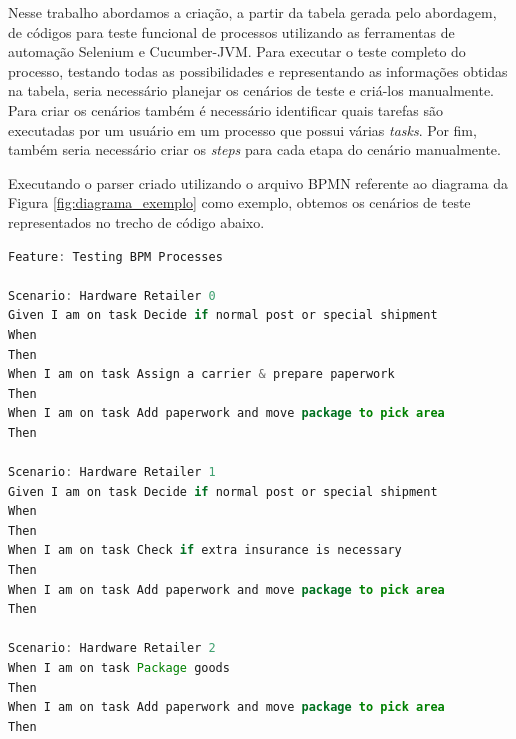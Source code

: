 \documentclass[12pt]{article}
\begin{document}
\begin{table}[]
\centering
\caption{Tabela obtida através do arquivo BPMN}
\label{tab:resultado}
\end{table}

Nesse trabalho abordamos a criação, a partir da tabela gerada pelo abordagem, de códigos para teste funcional de processos utilizando as ferramentas de automação Selenium e Cucumber-JVM. Para executar o teste completo do processo, testando todas as possibilidades e representando as informações obtidas na tabela, seria necessário planejar os cenários de teste e criá-los manualmente. Para criar os cenários também é necessário identificar quais tarefas são executadas por um usuário em um processo que possui várias \emph{tasks}. Por fim, também seria necessário criar os \emph{steps} para cada etapa do cenário manualmente.

Executando o parser criado utilizando o arquivo BPMN referente ao diagrama da Figura \ref{fig:diagrama_exemplo} como exemplo, obtemos os cenários de teste representados no trecho de código abaixo. 
\begin{lstlisting}[language=Java]
Feature: Testing BPM Processes  
 
Scenario: Hardware Retailer 0 
Given I am on task Decide if normal post or special shipment 
When 
Then 
When I am on task Assign a carrier & prepare paperwork 
Then 
When I am on task Add paperwork and move package to pick area 
Then 
 
Scenario: Hardware Retailer 1 
Given I am on task Decide if normal post or special shipment 
When 
Then 
When I am on task Check if extra insurance is necessary 
Then 
When I am on task Add paperwork and move package to pick area 
Then 
 
Scenario: Hardware Retailer 2
When I am on task Package goods 
Then 
When I am on task Add paperwork and move package to pick area 
Then 

\end{lstlisting}
\end{document}
